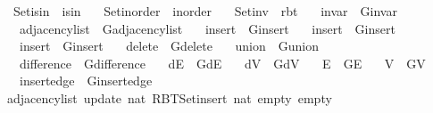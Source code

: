 \begin{isabellebody}
\ \ Set{\isacharunderscore}{\kern0pt}isin\ {\isacharequal}{\kern0pt}\ isin\ \isanewline
\ \ Set{\isacharunderscore}{\kern0pt}inorder\ {\isacharequal}{\kern0pt}\ inorder\ \isanewline
\ \ Set{\isacharunderscore}{\kern0pt}inv\ {\isacharequal}{\kern0pt}\ rbt\isanewline
\ \ \ invar\ {\isacharequal}{\kern0pt}\ G{\isachardot}{\kern0pt}invar\isanewline
\ \ \ adjacency{\isacharunderscore}{\kern0pt}list\ {\isacharequal}{\kern0pt}\ G{\isachardot}{\kern0pt}adjacency{\isacharunderscore}{\kern0pt}list\isanewline
\ \ \ insert\ {\isacharequal}{\kern0pt}\ G{\isachardot}{\kern0pt}insert\isanewline
\ \ \ insert{\isacharprime}{\kern0pt}\ {\isacharequal}{\kern0pt}\ G{\isachardot}{\kern0pt}insert{\isacharprime}{\kern0pt}\isanewline
\ \ \ insert{\isacharunderscore}{\kern0pt}{}\ {\isacharequal}{\kern0pt}\ G{\isachardot}{\kern0pt}insert{\isacharunderscore}{\kern0pt}{}\isanewline
\ \ \ delete{\isacharunderscore}{\kern0pt}{}\ {\isacharequal}{\kern0pt}\ G{\isachardot}{\kern0pt}delete{\isacharunderscore}{\kern0pt}{}\isanewline
\ \ \ union\ {\isacharequal}{\kern0pt}\ G{\isachardot}{\kern0pt}union\isanewline
\ \ \ difference\ {\isacharequal}{\kern0pt}\ G{\isachardot}{\kern0pt}difference\isanewline
\ \ \ dE\ {\isacharequal}{\kern0pt}\ G{\isachardot}{\kern0pt}dE\isanewline
\ \ \ dV\ {\isacharequal}{\kern0pt}\ G{\isachardot}{\kern0pt}dV\isanewline
\ \ \ E\ {\isacharequal}{\kern0pt}\ G{\isachardot}{\kern0pt}E\isanewline
\ \ \ V\ {\isacharequal}{\kern0pt}\ G{\isachardot}{\kern0pt}V\isanewline
\ \ \ insert{\isacharunderscore}{\kern0pt}edge\ {\isacharequal}{\kern0pt}\ G{\isachardot}{\kern0pt}insert{\isacharunderscore}{\kern0pt}edge\isanewline
%
\isadelimproof
\ \ %
\endisadelimproof
%
\isatagproof
\isacommand{{\isachardot}{\kern0pt}{\isachardot}{\kern0pt}}\isamarkupfalse%
%
\endisatagproof
{\isafoldproof}%
%
\isadelimproof
\isanewline
%
\endisadelimproof
%
\isadeliminvisible
\isanewline
%
\endisadeliminvisible
%
\isataginvisible
{}\isamarkupfalse%
\ {\isachardoublequoteopen}adjacency{\isacharunderscore}{\kern0pt}list\ {\isacharparenleft}{\kern0pt}update\ {\isacharparenleft}{\kern0pt}{}{\isacharcolon}{\kern0pt}{\isacharcolon}{\kern0pt}nat{\isacharparenright}{\kern0pt}\ {\isacharparenleft}{\kern0pt}RBT{\isacharunderscore}{\kern0pt}Set{\isachardot}{\kern0pt}insert\ {\isacharparenleft}{\kern0pt}{}{\isacharcolon}{\kern0pt}{\isacharcolon}{\kern0pt}nat{\isacharparenright}{\kern0pt}\ empty{\isacharparenright}{\kern0pt}\ empty{\isacharparenright}{\kern0pt}\ {}{\isachardoublequoteclose}\isanewline

\end{isabellebody}
